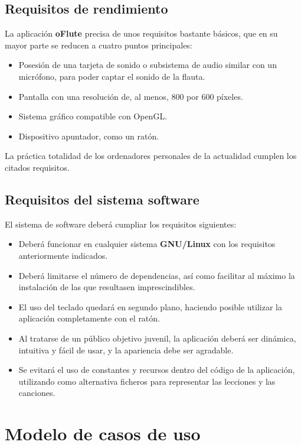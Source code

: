 \subsection{Requisitos de rendimiento}

La aplicación \textbf{oFlute} precisa de unos requisitos bastante básicos,
que en su mayor parte se reducen a cuatro puntos principales:
\begin{itemize}
\item Posesión de una tarjeta de sonido o subsistema de audio similar con un
  micrófono, para poder captar el sonido de la flauta.
\item Pantalla con una resolución de, al menos, 800 por 600 píxeles.
\item Sistema gráfico compatible con OpenGL.
\item Dispositivo apuntador, como un ratón.
\end{itemize}

La práctica totalidad de los ordenadores personales de la actualidad cumplen los
citados requisitos.

\subsection{Requisitos del sistema software}
El sistema de software deberá cumpliar los requisitos siguientes:
\begin{itemize}
\item Deberá funcionar en cualquier sistema \textbf{GNU/Linux} con los
  requisitos anteriormente indicados.
\item Deberá limitarse el número de dependencias, así como facilitar al máximo
  la instalación de las que resultasen imprescindibles.
\item El uso del teclado quedará en segundo plano, haciendo posible utilizar la
  aplicación completamente con el ratón.
\item Al tratarse de un público objetivo juvenil, la aplicación deberá ser
  dinámica, intuitiva y fácil de usar, y la apariencia debe ser agradable.
\item Se evitará el uso de constantes y recursos dentro del código de la
  aplicación, utilizando como alternativa ficheros para representar las
  lecciones y las canciones.
\end{itemize}

\section{Modelo de casos de uso}

